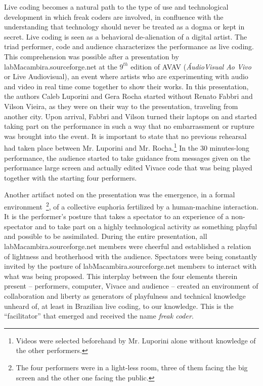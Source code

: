 \documentclass[12pt,times,twocolumn]{article}
\begin{document}
Live coding becomes a natural path to the type of use and
technological development in which freak coders are involved, in
confluence with the understanding that technology should never be
treated as a dogma or kept in secret. Live coding is seen as a
behavioral de-alienation of a digital artist.
The triad
performer, code and audience characterizes the performance as live
coding.  This comprehension was possible after a presentation by
labMacambira.sourceforge.net at the $9^{th}$ edition of AVAV
(\textit{\'{A}udioVisual Ao Vivo} or Live Audiovisual), an event where
artists who are experimenting with audio and video in real time come
together to show their works. In this presentation, the authors Caleb
Luporini and Gera Rocha started without Renato Fabbri and Vilson
Vieira, as they were on their way to the presentation, traveling from
another city. Upon arrival, Fabbri and Vilson turned their laptops on and
started taking part on the performance in such a way that no
embarrassment or rupture was brought into the event.  It is important
to state that no previous rehearsal had taken place between
Mr. Luporini and Mr. Rocha.\footnote{Videos were selected beforehand
  by Mr. Luporini alone without knowledge of the other performers.} In
the 30 minutes-long performance, the audience started to take guidance
from messages given on the performance large screen and actually edited
Vivace code that was being played together with the starting four
performers.

Another artifact noted on the presentation was the emergence, in a
formal environment~\footnote{The four performers were in a light-less
  room, three of them facing the big screen and the other one facing
  the public.}, of a collective euphoria fertilized by a human-machine
interaction. It is the performer's posture that takes a spectator to
an experience of a non-spectator and to take part on a highly
technological activity as something playful and possible to be
assimilated. During the entire presentation, all
labMacambira.sourceforge.net members were cheerful and established a
relation of lightness and brotherhood with the audience.  Spectators
were being constantly invited by the posture of
labMacambira.sourceforge.net members to interact with what was being
proposed.  This interplay between the four elements therein present --
performers, computer, Vivace and audience -- created an
environment of collaboration and liberty as generators of playfulness
and technical knowledge unheard of, at least in Brazilian live coding,
to our knowledge. This is the ``facilitator'' that emerged and received the name
\emph{freak coder}.
\end{document}

